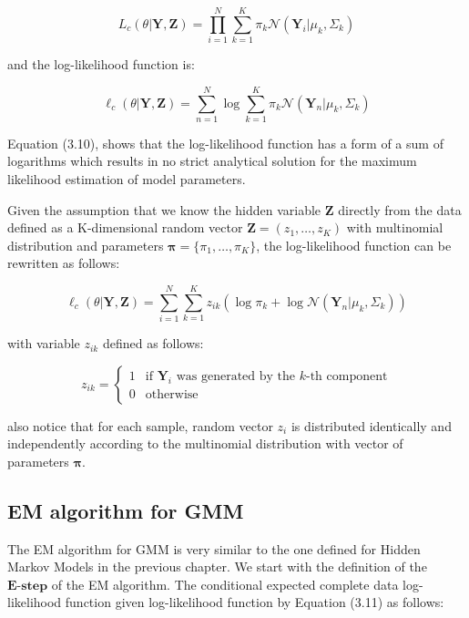 \begin{equation} \label{eq:likelihood-gaussian}
    L_c(\theta|\textbf{Y},\textbf{Z}) = \prod_{i=1}^{N} \sum_{k=1}^{K} \pi_k \mathcal{N}(\textbf{Y}_i|\mu_k,\Sigma_k)
\end{equation}

and the log-likelihood function is:

\begin{equation}
    \ell_c(\theta|\textbf{Y},\textbf{Z}) = \sum_{n=1}^{N} \log \sum_{k=1}^{K} \pi_k \mathcal{N}(\textbf{Y}_n|\mu_k,\Sigma_k)
\end{equation}

Equation (3.10), shows that the log-likelihood function has a form of a sum of logarithms which results in no strict analytical solution for the maximum likelihood estimation of model parameters.

Given the assumption that we know the hidden variable $\textbf{Z}$ directly from the data defined as a K-dimensional random vector $\textbf{Z}=(z_1,\ldots,z_K)$ 
with multinomial distribution and parameters $\boldsymbol{\pi} = \{\pi_1,\ldots,\pi_K\}$, the log-likelihood function can be rewritten as follows:

\begin{equation}
    \ell_c(\theta|\textbf{Y},\textbf{Z}) = \sum_{i=1}^{N} \sum_{k=1}^{K} z_{ik} \left(\log \pi_k + \log \mathcal{N}(\textbf{Y}_n|\mu_k,\Sigma_k)\right)
\end{equation}

with variable $z_{ik}$ defined as follows:

\begin{equation}
    z_{ik} = \begin{cases}
        1 & \text{if } \textbf{Y}_i \text{ was generated by the } k\text{-th component} \\
        0 & \text{otherwise}
    \end{cases}
\end{equation}

also notice that for each sample, random vector $z_{i}$ is distributed identically and independently according to the multinomial distribution with vector of parameters $\boldsymbol{\pi}$.

\subsection{EM algorithm for GMM}

The EM algorithm for GMM is very similar to the one defined for Hidden Markov Models in the previous chapter. 
We start with the definition of the $\textbf{E-step}$ of the EM algorithm. The conditional expected complete 
data log-likelihood function given log-likelihood function by Equation (3.11) as follows:

